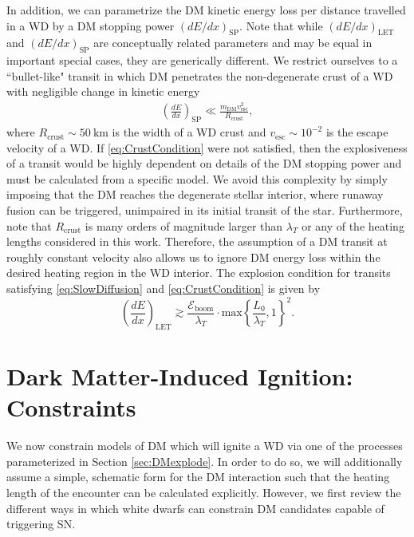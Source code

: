 \documentclass[twocolumn,preprintnumbers,amsmath,amssymb,prl, superscriptaddress]{revtex4}
\newcommand{\Eboom}{\mathcal{E}_\text{boom}}
\begin{document}
In addition, we can parametrize the DM kinetic energy loss per distance travelled in a WD by a DM stopping power $(dE/dx)_\text{SP}$.
Note that while $(dE/dx)_\text{LET}$ and $(dE/dx)_\text{SP}$ are conceptually related parameters and may be equal in important special cases, they are generically different.
We restrict ourselves to a ``bullet-like" transit in which DM penetrates the non-degenerate crust of a WD with negligible change in kinetic energy
\begin{align}
\label{eq:CrustCondition}
  \left( \frac{d E}{d x} \right)_\text{SP} \ll
  \frac{m_\text{DM} v^2_\text{esc}}{R_\text{crust}},
\end{align}
where $R_\text{crust} \sim 50 ~\text{km}$ is the width of a WD crust \cite{Chandrasekhar} and $v_\text{esc} \sim 10^{-2}$ is the escape velocity of a WD.
If \eqref{eq:CrustCondition} were not satisfied, then the explosiveness of a transit would be highly dependent on details of the DM stopping power and must be calculated from a specific model.
We avoid this complexity by simply imposing that the DM reaches the degenerate stellar interior, where runaway fusion can be triggered, unimpaired in its initial transit of the star.
Furthermore, note that $R_\text{crust}$ is many orders of magnitude larger than $\lambda_T$ or any of the heating lengths considered in this work.
Therefore, the assumption of a DM transit at roughly constant velocity also allows us to ignore DM energy loss within the desired heating region in the WD interior.
The explosion condition for transits satisfying \eqref{eq:SlowDiffusion} and \eqref{eq:CrustCondition} is given by
\begin{equation}
\label{eq:transitexplosion}
  \left( \frac{d E}{d x} \right)_\text{LET} \gtrsim \frac{\Eboom}{\lambda_T} \cdot \text{max} \left \{\frac{L_0}{\lambda_T}, 1 \right \}^2.
\end{equation}
\section{Dark Matter-Induced Ignition: Constraints}
\label{sec:Constraints}

We now constrain models of DM which will ignite a WD via one of the processes parameterized in Section \ref{sec:DMexplode}.
In order to do so, we will additionally assume a simple, schematic form for the DM interaction such that the heating length of the encounter can be calculated explicitly. 
However, we first review the different ways in which white dwarfs can constrain DM candidates capable of triggering SN.
\end{document}
